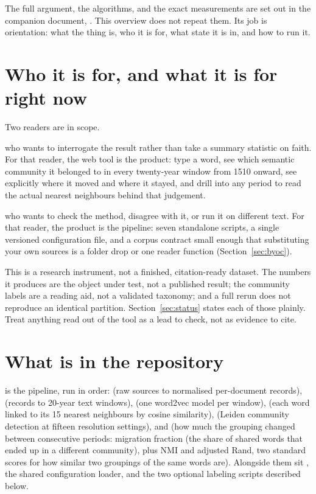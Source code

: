 \documentclass[11pt]{article}
\begin{document}
The full argument, the algorithms, and the exact measurements are set out
in the companion document, . This overview does not
repeat them. Its job is orientation: what the thing is, who it is for,
what state it is in, and how to run it.

\section{Who it is for, and what it is for right now}

Two readers are in scope.

 who wants to interrogate
the result rather than take a summary statistic on faith. For that
reader, the web tool is the product: type a word, see which semantic
community it belonged to in every twenty-year window from 1510 onward,
see explicitly where it moved and where it stayed, and drill into any
period to read the actual nearest neighbours behind that judgement.

 who wants to check
the method, disagree with it, or run it on different text. For that
reader, the product is the pipeline: seven standalone scripts, a single
versioned configuration file, and a corpus contract small enough that
substituting your own sources is a folder drop or one reader function
(Section~\ref{sec:byoc}).

\begin{claimbox}
 This is a research instrument, not a
finished, citation-ready dataset. The numbers it produces are the object
under test, not a published result; the community labels are a reading
aid, not a validated taxonomy; and a full rerun does not reproduce an
identical partition. Section~\ref{sec:status} states each of those
plainly. Treat anything read out of the tool as a lead to check, not as
evidence to cite.
\end{claimbox}

\section{What is in the repository}

 is the pipeline, run in order: 
(raw sources to normalised per-document records), 
(records to 20-year text windows),  (one word2vec
model per window),  (each word linked to its 15 nearest
neighbours by cosine similarity),  (Leiden community
detection at fifteen resolution settings), and  (how much
the grouping changed between consecutive periods: migration fraction
(the share of shared words that ended up in a different community),
plus NMI and adjusted Rand, two standard scores for how similar two
groupings of the same words are). Alongside them sit
, the
shared configuration loader, and the two optional labeling scripts
described below.
\end{document}
